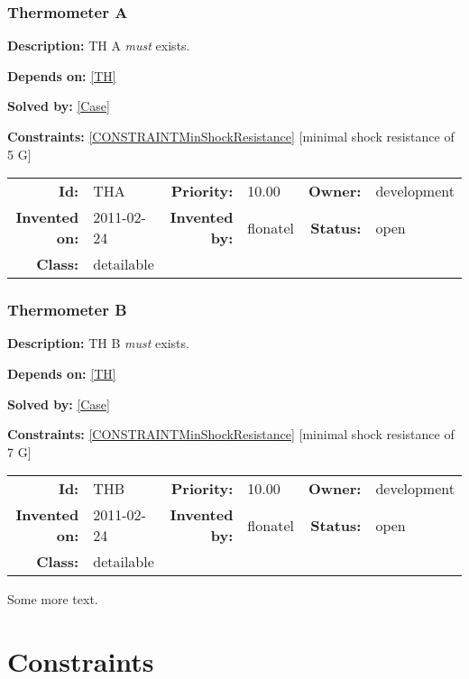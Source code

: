 \subsection{Thermometer A}\label{THA}
\textbf{Description:} TH A \textsl{must} exists.

\textbf{Depends on:} \ref{TH} 

\textbf{Solved by:} \ref{Case} 

\textbf{Constraints:} \ref{CONSTRAINTMinShockResistance}  [minimal shock resistance of 5 G] 

\par
{\small \begin{center}\begin{tabular}{rlrlrl}
\textbf{Id:} & THA  & \textbf{Priority:} & 10.00  & \textbf{Owner:} & development\\ 
\textbf{Invented on:} & 2011-02-24  & \textbf{Invented by:} & flonatel  & \textbf{Status:} & open \\ 
\textbf{Class:} & detailable  & & & \end{tabular}\end{center} }

\subsection{Thermometer B}\label{THB}
\textbf{Description:} TH B \textsl{must} exists.

\textbf{Depends on:} \ref{TH} 

\textbf{Solved by:} \ref{Case} 

\textbf{Constraints:} \ref{CONSTRAINTMinShockResistance}  [minimal shock resistance of 7 G] 

\par
{\small \begin{center}\begin{tabular}{rlrlrl}
\textbf{Id:} & THB  & \textbf{Priority:} & 10.00  & \textbf{Owner:} & development\\ 
\textbf{Invented on:} & 2011-02-24  & \textbf{Invented by:} & flonatel  & \textbf{Status:} & open \\ 
\textbf{Class:} & detailable  & & & \end{tabular}\end{center} }

Some more text.
\chapter{Constraints}
